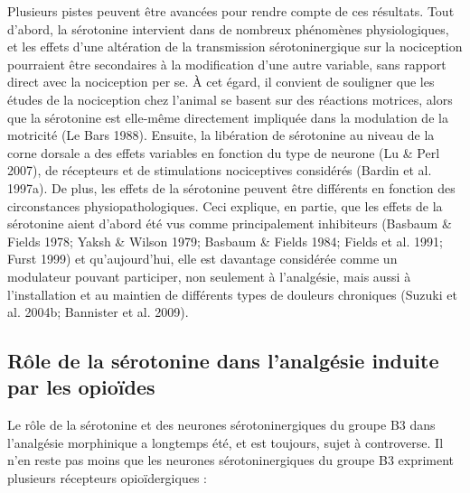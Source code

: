 \documentclass[a4paper,12pt,twoside]{report}
\begin{document}
Plusieurs pistes peuvent être avancées pour rendre compte de ces résultats. Tout d’abord, la sérotonine intervient dans de nombreux phénomènes physiologiques, et les effets d’une altération de la transmission sérotoninergique sur la nociception pourraient être secondaires à la modification d’une autre variable, sans rapport direct avec la nociception per se. À cet égard, il convient de souligner que les études de la nociception chez l’animal se basent sur des réactions motrices, alors que la sérotonine est elle-même directement impliquée dans la modulation de la motricité (Le Bars 1988). Ensuite, la libération de sérotonine au niveau de la corne dorsale a des effets variables en fonction du type de neurone (Lu \& Perl 2007), de récepteurs et de stimulations nociceptives considérés (Bardin et al. 1997a). De plus, les effets de la sérotonine peuvent être différents en fonction des circonstances physiopathologiques. Ceci explique, en partie, que les effets de la sérotonine aient d’abord été vus comme principalement inhibiteurs (Basbaum \& Fields 1978; Yaksh \& Wilson 1979; Basbaum \& Fields 1984; Fields et al. 1991; Furst 1999) et qu’aujourd’hui, elle est davantage considérée comme un modulateur pouvant participer, non seulement à l’analgésie, mais aussi à l’installation et au maintien de différents types de douleurs chroniques (Suzuki et al. 2004b; Bannister et al. 2009). 

\subsection{Rôle de la sérotonine dans l'analgésie induite par les opioïdes}
\label{Role de la 5-HT dans analgésie opioidergique}

Le rôle de la sérotonine et des neurones sérotoninergiques du groupe B3 dans l’analgésie morphinique a longtemps été, et est toujours, sujet à controverse. Il n’en reste pas moins que les neurones sérotoninergiques du groupe B3 expriment plusieurs récepteurs opioïdergiques :
\end{document}
